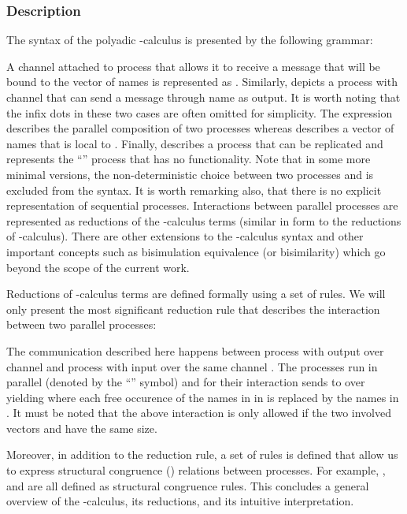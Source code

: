 \documentclass[copyright,creativecommons]{eptcs}
\begin{document}
\subsubsection{Description}
\label{pidesc}


The syntax of the polyadic -calculus is presented by the following grammar:

A channel  attached to process  that allows it to receive a message that will be bound to the vector of names  is represented as . Similarly,  depicts a process with channel  that can send a message through name  as output. It is worth noting that the infix dots in these two cases are often omitted for simplicity. The expression  describes the parallel composition of two processes whereas  describes a vector of names  that is local to . Finally,  describes a process  that can be replicated and  represents the ``'' process that has no functionality. Note that in some more minimal versions, the non-deterministic choice  between two processes  and  is excluded from the syntax. It is worth remarking also, that there is no explicit representation of sequential processes. Interactions between parallel processes are represented as reductions of the -calculus terms (similar in form to the reductions of -calculus). There are other extensions to the -calculus syntax and other important concepts such as bisimulation equivalence (or bisimilarity) \cite{sangiorgi1996theory} which go beyond the scope of the current work.


Reductions of -calculus terms are defined formally using a set of rules. We will only present the most significant reduction rule that describes the interaction between two parallel processes:


The communication described here happens between process  with output  over channel  and process  with input  over the same channel . The processes run in parallel (denoted by the ``'' symbol) and for their interaction  sends  to  over  yielding  where each free occurence of the names in  in  is replaced by the names in . It must be noted that the above interaction is only allowed if the two involved vectors  and  have the same size.

Moreover, in addition to the reduction rule, a set of rules is defined that allow us to express structural congruence () relations between processes. For example, ,  and  are all defined as structural congruence rules. This concludes a general overview of the -calculus, its reductions, and its intuitive interpretation.
\end{document}
